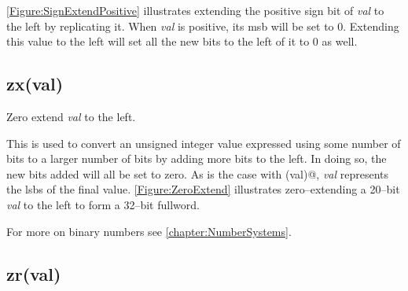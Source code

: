 \begin{figure}[ht]
\centering
{}
\label{Figure:SignExtendNegative}
\end{figure}


\autoref{Figure:SignExtendPositive} illustrates extending the positive sign 
bit of {\em val} to the left by replicating it.
When {\em val} is positive, its \acrshort{msb} will be set to 0.  Extending this 
value to the left will set all the new bits to the left of it to 0 as well.  


\begin{figure}[ht]
\centering
{}
\label{Figure:SignExtendPositive}
\end{figure}



\subsection{zx(val)}
\label{extension:zx}

Zero extend {\em val} to the left.

This is used to convert an unsigned integer value expressed using some number of 
bits to a larger number of bits by adding more bits to the left.  In doing so, 
the new bits added will all be set to zero.  As is the case with \verb@sx(val)@,
{\em val} represents the \acrshort{lsb}s of the final value.  
\autoref{Figure:ZeroExtend} illustrates zero--extending a 20--bit {\em val} to the 
left to form a 32--bit fullword.

For more on binary numbers see \autoref{chapter:NumberSystems}.

\begin{figure}[ht]
\centering
{}
\label{Figure:ZeroExtend}
\end{figure}




\subsection{zr(val)}
\label{extension:zr}

